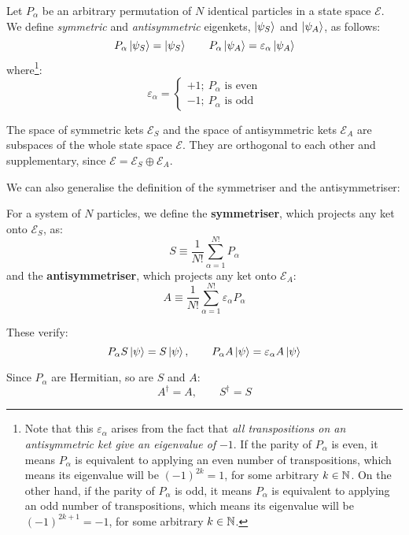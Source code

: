 \begin{definition}
    Let $P_\alpha$ be an arbitrary permutation of $N$ identical particles in a state space $\mathcal{E}$. We define \textit{symmetric} and \textit{antisymmetric} eigenkets, $\ket{\psi_S}$ and $\ket{\psi_A}$, as follows:
    \begin{equation}
        P_\alpha\ket{\psi_S} = \ket{\psi_S}\qquad P_\alpha\ket{\psi_A} = \varepsilon_\alpha\ket{\psi_A}
    \end{equation}
    where\footnote{Note that this $\varepsilon_\alpha$ arises from the fact that \textit{all transpositions on an antisymmetric ket give an eigenvalue of} $-1$. If the parity of $P_\alpha$ is even, it means $P_\alpha$ is equivalent to applying an even number of transpositions, which means its eigenvalue will be $(-1)^{2k} = 1$, for some arbitrary $k\in\mathbb{N}$. On the other hand, if the parity of $P_\alpha$ is odd, it means $P_\alpha$ is equivalent to applying an odd number of transpositions, which means its eigenvalue will be $(-1)^{2k + 1} = -1$, for some arbitrary $k\in\mathbb{N}$.}:
    \begin{equation}
        \varepsilon_\alpha = \begin{cases}
            +1;\ P_\alpha\text{ is even}\\
            -1;\ P_\alpha\text{ is odd}
        \end{cases}
    \end{equation} 

    The space of symmetric kets $\mathcal{E}_S$ and the space of antisymmetric kets $\mathcal{E}_A$ are subspaces of the whole state space $\mathcal{E}$. They are orthogonal to each other and supplementary, since $\mathcal{E} = \mathcal{E}_S \oplus \mathcal{E}_A$.
\end{definition}
 
We can also generalise the definition of the symmetriser and the antisymmetriser:

\begin{definition}
    For a system of $N$ particles, we define the \textbf{symmetriser}, which projects any ket onto $\mathcal{E}_S$, as:
    \begin{equation}
        S \equiv \frac{1}{N!}\sum_{\alpha=1}^{N!} P_\alpha
    \end{equation}
    and the \textbf{antisymmetriser}, which projects any ket onto $\mathcal{E}_A$:
    \begin{equation}
        A \equiv \frac{1}{N!}\sum_{\alpha=1}^{N!} \varepsilon_\alpha P_\alpha
    \end{equation}

    These verify:
    \begin{equation}
        P_\alpha S\ket{\psi} = S\ket{\psi}, \qquad P_\alpha A\ket{\psi} = \varepsilon_\alpha A\ket{\psi}
    \end{equation}

    Since $P_\alpha$ are Hermitian, so are $S$ and $A$:
    \begin{equation}
        A^\dagger = A,\qquad S^\dagger = S
    \end{equation}
\end{definition}

